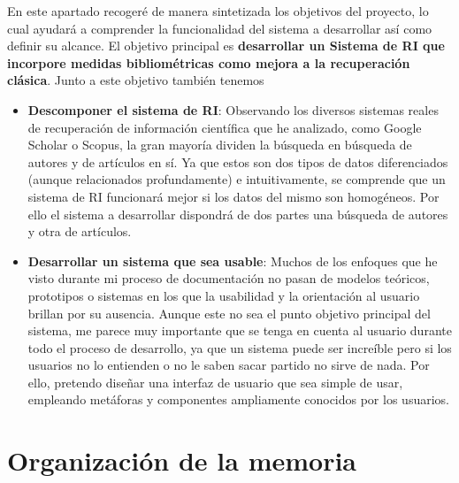 En este apartado recogeré de manera sintetizada los objetivos del proyecto, lo cual ayudará a comprender la funcionalidad del sistema a desarrollar así como definir su alcance. El objetivo principal es \textbf{desarrollar un Sistema de \acrlong{RI} que incorpore medidas bibliométricas como mejora a la recuperación clásica}. Junto a este objetivo también tenemos 

\begin{itemize}

	
	\item \textbf{Descomponer el sistema de \acrshort{RI}}: Observando los diversos sistemas reales de recuperación de información científica que he analizado, como Google Scholar o Scopus, la gran mayoría dividen la búsqueda en búsqueda de autores y de artículos en sí. Ya que estos son dos tipos de datos diferenciados (aunque relacionados profundamente) e intuitivamente, se comprende que un sistema de RI funcionará mejor si los datos del mismo son homogéneos. Por ello el sistema a desarrollar dispondrá de dos partes una búsqueda de autores y otra de artículos.
	
	\item \textbf{Desarrollar un sistema que sea usable}: Muchos de los enfoques que he visto durante mi proceso de documentación no pasan de modelos teóricos, prototipos o sistemas en los que la usabilidad y la orientación al usuario brillan por su ausencia. Aunque este no sea el punto objetivo principal del sistema, me parece muy importante que se tenga en cuenta al usuario durante todo el proceso de desarrollo, ya que un sistema puede ser increíble pero si los usuarios no lo entienden o no le saben sacar partido no sirve de nada. Por ello, pretendo diseñar una interfaz de usuario que sea simple de usar, empleando metáforas y componentes ampliamente conocidos por los usuarios.

\end{itemize}


\section{Organización de la memoria}

